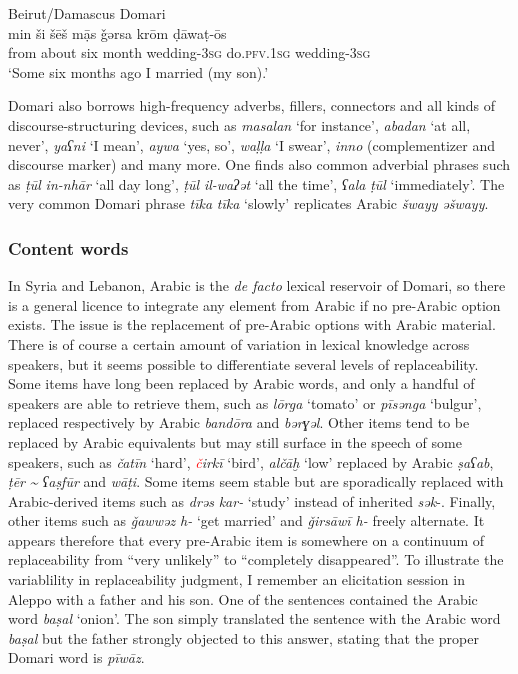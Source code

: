 \documentclass[output=paper]{langsci/langscibook}
\begin{document}
\ea\label{ex:key:}
{Beirut/Damascus Domari}\\
\gll min ši šēš mạ̄s ǧərsa krōm ḍāwaṭ-ōs\\
     from about six month wedding-\textsc{3sg} do.\textsc{pfv.1sg} wedding-\textsc{3sg}\\
\glt ‘Some six months ago I married (my son).’
\z
 
Domari also borrows high-frequency adverbs, fillers, connectors and all kinds of discourse-structuring devices, such as \textit{masalan} ‘for instance’, \textit{abadan} ‘at all, never’, \textit{yaʕni}  ‘I mean’, \textit{aywa} ‘yes, so’, \textit{waḷḷa} ‘I swear’, \textit{inno} (complementizer and discourse marker) and many more. One finds also common adverbial phrases such as \textit{ṭūl} \textit{in-nhār} ‘all day long’, \textit{ṭūl} \textit{il-waʔət} ‘all the time’, \textit{ʕala} \textit{ṭūl} ‘immediately’.  The very common Domari phrase \textit{tīka} \textit{tīka} ‘slowly’ replicates Arabic \textit{šwayy} \textit{əšwayy}.


 \subsubsection{Content words}

In Syria and Lebanon, Arabic is the \textit{de facto} lexical reservoir of Domari, so there is a general licence to integrate any element from Arabic if no pre-Arabic option exists. The issue is the replacement of pre-Arabic options with Arabic material. There is of course a certain amount of variation in lexical knowledge across speakers, but it seems possible to differentiate several levels of replaceability. Some items have long been replaced by Arabic words, and only a handful of speakers are able to retrieve them, such as \textit{lōrga} ‘tomato’ or \textit{pīsənga} ‘bulgur’, replaced respectively by Arabic \textit{bandōra} and \textit{bərɣəl}. Other items tend to be replaced by Arabic equivalents but may still surface in the speech of some speakers, such as \textit{čatīn} ‘hard’, \textit{\textcolor{red}{č}irkī} ‘bird’, \textit{alčāḫ} ‘low’ replaced by Arabic \textit{ṣaʕab}, \textit{ṭēr} \textit{{\textasciitilde} ʕaṣfūr} and \textit{wāṭi}. Some items seem stable but are sporadically replaced with Arabic-derived items such as \textit{drəs} \textit{kar-} ‘study’ instead of inherited \textit{sək}{}-. Finally, other items  such as \textit{\v{g}awwəz h-} ‘get married’ and \textit{\v{g}irsāwī h-} freely alternate. It appears therefore that every pre-Arabic item is somewhere on a continuum of replaceability from ``very unlikely'' to ``completely disappeared''. To illustrate the variablility in replaceability judgment, I remember an elicitation session in Aleppo with a father and his son. One of the sentences contained the Arabic word \textit{baṣal} ‘onion’. The son simply translated the sentence with the Arabic word \textit{baṣal} but the father strongly objected to this answer, stating that the proper Domari word is \textit{pīwāz}.
\end{document}
